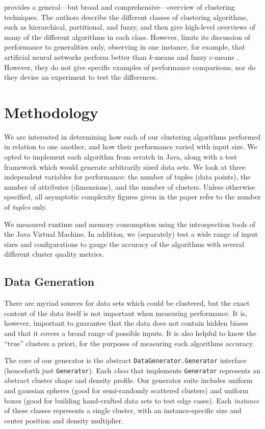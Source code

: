 \documentclass[11pt,letterpaper]{article}
\begin{document}
\cite{Jain99} provides a general---but broad and comprehensive---overview of clustering techniques.  The authors describe the different classes of clustering algorithms, such as hierarchical, partitional, and fuzzy, and then give high-level overviews of many of the different algorithms in each class.  However, \cite{Jain99} limits its discussion of performance to generalities only, observing in one instance, for example, that artificial neural networks perform better than $k$-means and fuzzy $c$-means \cite{Jain99}.  However, they do not give specific examples of performance comparisons, nor do they devise an experiment to test the differences.

\section{Methodology}
We are interested in determining how each of our clustering algorithms performed in relation to one another, and how their performance varied with input size.  We opted to implement each algorithm from scratch in Java, along with a test framework which would generate arbitrarily sized data sets.  We look at three independent variables for performance: the number of tuples (data points), the number of attributes (dimensions), and the number of clusters.  Unless otherwise specified, all asymptotic complexity figures given in the paper refer to the number of \emph{tuples} only.

We measured runtime and memory consumption using the introspection tools of the Java Virtual Machine. In addition, we (separately) test a wide range of input sizes and configurations to gauge the accuracy of the algorithms with several different cluster quality metrics.

\subsection{Data Generation}
There are myriad sources for data sets which could be clustered, but the exact content of the data itself is not important when measuring performance.  It is, however, important to guarantee that the data does not contain hidden biases and that it covers a broad range of possible inputs.  It is also helpful to know the ``true'' clusters a priori, for the purposes of measuring each algorithms accuracy.

The core of our generator is the abstract \verb+DataGenerator.Generator+ interface (henceforth just 
\verb+Generator+).  Each \emph{class} that implements \verb+Generator+ represents an abstract cluster shape and density profile.
Our generator suite includes uniform and gaussian spheres (good for semi-randomly scattered clusters) and uniform boxes (good for building hand-crafted data sets to test edge cases).  Each \emph{instance} of these classes represents a single cluster, with an instance-specific size and center position and density multiplier.
\end{document}
